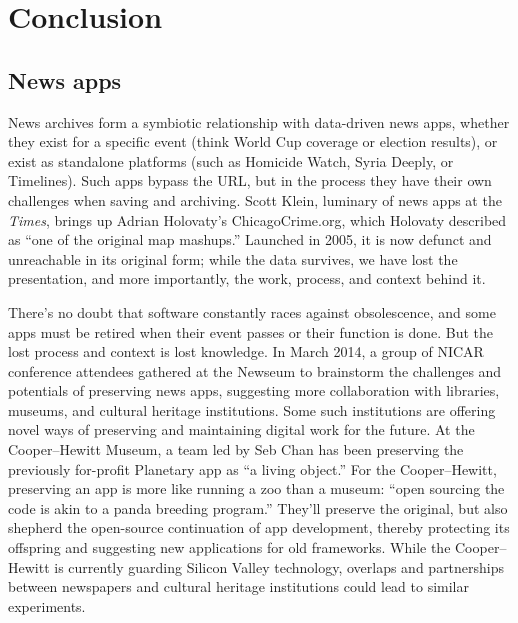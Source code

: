 \chapter{Conclusion}

\section{News apps}


News archives form a symbiotic relationship with data-driven news apps, whether they exist for a specific event (think World Cup coverage or election results), or exist as standalone platforms (such as Homicide Watch, Syria Deeply, or Timelines). Such apps bypass the URL, but in the process they have their own challenges when saving and archiving. Scott Klein, luminary of news apps at the \emph{Times}, brings up Adrian Holovaty's ChicagoCrime.org, which Holovaty described as ``one of the original map mashups.''\autocite{holovaty_memory_2008} Launched in 2005, it is now defunct and unreachable in its original form; while the data survives, we have lost the presentation, and more importantly, the work, process, and context behind it.

There's no doubt that software constantly races against obsolescence, and some apps must be retired when their event passes or their function is done. But the lost process and context is lost knowledge. In March 2014, a group of NICAR conference attendees gathered at the Newseum to brainstorm the challenges and potentials of preserving news apps, suggesting more collaboration with libraries, museums, and cultural heritage institutions.\autocite{_opennews/hackdays/archive_????} Some such institutions are offering novel ways of preserving and maintaining digital work for the future. At the Cooper--Hewitt Museum, a team led by Seb Chan has been preserving the previously for-profit Planetary app as ``a living object.'' For the Cooper--Hewitt, preserving an app is more like running a zoo than a museum: ``open sourcing the code is akin to a panda breeding program.''\autocite{chan_planetary:_2013} They'll preserve the original, but also shepherd the open-source continuation of app development, thereby protecting its offspring and suggesting new applications for old frameworks. While the Cooper--Hewitt is currently guarding Silicon Valley technology, overlaps and partnerships between newspapers and cultural heritage institutions could lead to similar experiments.

